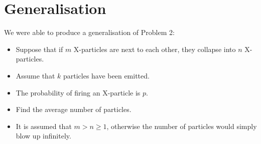\section{Generalisation}

We were able to produce a generalisation of Problem 2:
\begin{itemize}
  \item Suppose that if $m$ X-particles are next to each other, they collapse into $n$ X-particles.
  \item Assume that $k$ particles have been emitted.
  \item The probability of firing an X-particle is $p$.
  \item Find the average number of particles.
  \item It is assumed that $m > n \ge 1$, otherwise the number of particles would simply blow up infinitely.
\end{itemize}


